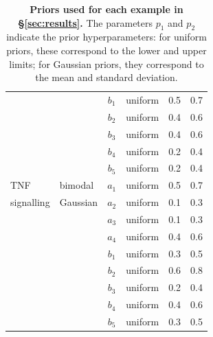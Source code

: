 \begin{table}[H]
\begin{adjustwidth}{0in}{0in}
\begin{tabularx}{1.0\textwidth}{llclcc}
&& $b_1$ & uniform & 0.5 & 0.7\\
&& $b_2$ & uniform & 0.4 & 0.6\\
&& $b_3$ & uniform & 0.4 & 0.6\\
&& $b_4$ & uniform & 0.2 & 0.4\\
&& $b_5$ & uniform & 0.2 & 0.4\\
\toprule
TNF  & bimodal  & $a_1$ & uniform & 0.5 & 0.7\\
signalling& Gaussian & $a_2$ & uniform & 0.1 & 0.3\\
&& $a_3$ & uniform & 0.1 & 0.3\\
&& $a_4$ & uniform & 0.4 & 0.6\\
&& $b_1$ & uniform & 0.3 & 0.5\\
&& $b_2$ & uniform & 0.6 & 0.8\\
&& $b_3$ & uniform & 0.2 & 0.4\\
&& $b_4$ & uniform & 0.4 & 0.6\\
&& $b_5$ & uniform & 0.3 & 0.5\\
\end{tabularx}
\caption{\textbf{Priors used for each example in \S\ref{sec:results}.} The parameters $p_1$ and $p_2$ indicate the prior hyperparameters: for uniform priors, these correspond to the lower and upper limits; for Gaussian priors, they correspond to the mean and standard deviation.}
\label{tab:priors}
\end{adjustwidth}
\end{table}
